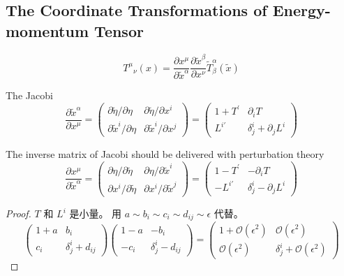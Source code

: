 \documentclass{ctexart}
\begin{document}
\subsection{The Coordinate Transformations of Energy-momentum Tensor}

\begin{equation}
    T^\mu{ }_\nu(x)=\frac{\partial x^\mu}{\partial \tilde{x}^\alpha} \frac{\partial \tilde{x}^\beta}{\partial x^\nu} \tilde{T}_\beta^\alpha(\tilde{x})
\end{equation}

The Jacobi
\begin{equation}
    \frac{\partial \tilde{x}^\alpha}{\partial x^\mu}=\left(\begin{array}{cc}
    \partial \tilde{\eta} / \partial \eta & \partial \tilde{\eta} / \partial x^i \\
    \partial \tilde{x}^i / \partial \eta & \partial \tilde{x}^i / \partial x^j
    \end{array}\right)=\left(\begin{array}{cc}
    1+T^{\prime} & \partial_i T \\
    L^{i \prime} & \delta_j^i+\partial_j L^i
    \end{array}\right)
\end{equation}

The inverse matrix of Jacobi should be delivered with perturbation theory 
\begin{equation}
    \frac{\partial x^\mu}{\partial \tilde{x}^\alpha}=\left(\begin{array}{cc}
    \partial \eta / \partial \tilde{\eta} & \partial \eta / \partial \tilde{x}^i \\
    \partial x^i / \partial \tilde{\eta} & \partial x^i / \partial \tilde{x}^j
    \end{array}\right)=\left(\begin{array}{cc}
    1-T^{\prime} & -\partial_i T \\
    -L^{i \prime} & \delta_j^i-\partial_j L^i
    \end{array}\right)
\end{equation}

\begin{proof}
    $T$ 和 $L^i$ 是小量。 用 $a \sim b_i \sim c_i \sim d_{ij} \sim \epsilon$ 代替。
    \begin{equation}
        \left(\begin{array}{cc}
            1+ a & b_i \\
            c_i & \delta_j^i+ d_{ij}
            \end{array}\right) 
        \left(\begin{array}{cc}
            1- a & -b_i \\
            -c_i & \delta_j^i- d_{ij}
            \end{array}\right)  = 
        \left(\begin{array}{cc}
            1 + \mathcal{O} (\epsilon^2) & \mathcal{O} (\epsilon^2) \\
            \mathcal{O} (\epsilon^2) & \delta_j^i + \mathcal{O} (\epsilon^2)
            \end{array}\right) 
    \end{equation}
\end{proof}
\end{document}
